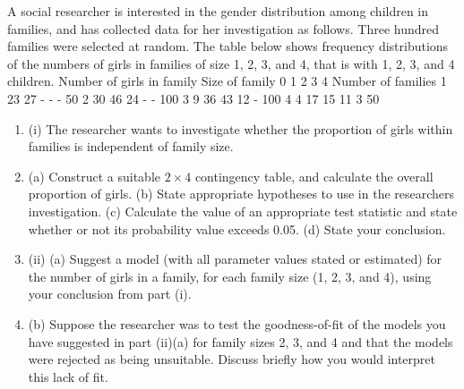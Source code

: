 \documentclass[a4paper,12pt]{article}
\begin{document}
 A social researcher is interested in the gender distribution among children in families, and has collected data for her investigation as follows.
Three hundred families were selected at random. The table below shows frequency
distributions of the numbers of girls in families of size 1, 2, 3, and 4, that is with 1, 2, 3, and 4 children.
Number of girls in family
Size of
family 0 1 2 3 4
Number of
families
1 23 27 - - - 50
2 30 46 24 - - 100
3 9 36 43 12 - 100
4 4 17 15 11 3 50
\begin{enumerate}
    \item (i) The researcher wants to investigate whether the proportion of girls within
families is independent of family size.
\item (a) Construct a suitable $2 \times 4$ contingency table, and calculate the overall
proportion of girls.
(b) State appropriate hypotheses to use in the researchers investigation.
(c) Calculate the value of an appropriate test statistic and state whether or not its probability value exceeds 0.05.
(d) State your conclusion. 
\item (ii) (a) Suggest a model (with all parameter values stated or estimated) for the number of girls in a family, for each family size (1, 2, 3, and 4), using your conclusion from part (i).
\item (b) Suppose the researcher was to test the goodness-of-fit of the models you have suggested in part (ii)(a) for family sizes 2, 3, and 4 and that the models were rejected as being unsuitable. Discuss briefly how you would interpret this lack of fit. 
\end{enumerate}
\end{document}
